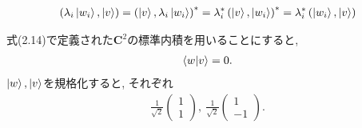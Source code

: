\begin{ex}
    \label{ex2.6}
    \begin{align*}
        \left(
        \lambda_i \ket{w_i} , \ket{v}
        \right)
        =
        \left(
        \ket{v},
        \lambda_i \ket{w_i}
        \right)^*
        =
        \lambda_i^*
        \left(
        \ket{v},\ket{w_i}
        \right)^*
        =
        \lambda_i^*
        \left(
        \ket{w_i},\ket{v}
        \right)
    \end{align*}
\end{ex}

\begin{ex}
    \label{ex2.7}
    式(2.14)で定義された$\bm{C}^2$の標準内積を用いることにすると,
    \begin{align*}
        \braket{w|v}=0.
    \end{align*}
    $\ket{w},\ket{v}$を規格化すると, それぞれ
    \begin{align*}
        \frac{1}{\sqrt{2}}
        \begin{pmatrix}
            1 \\ 1
        \end{pmatrix}
        ,\
        \frac{1}{\sqrt{2}}
        \begin{pmatrix}
            1 \\ -1
        \end{pmatrix}.
    \end{align*}
\end{ex}


